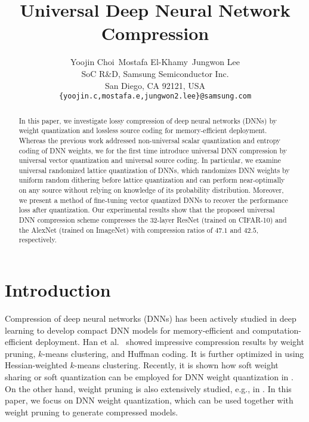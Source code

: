 \documentclass{article}
\title{Universal Deep Neural Network Compression}
\author{
  Yoojin Choi\qquad~Mostafa El-Khamy\qquad~Jungwon Lee\\
  SoC R\&D, Samsung Semiconductor Inc.\\
  San Diego, CA 92121, USA\\
  \texttt{\{yoojin.c,mostafa.e,jungwon2.lee\}@samsung.com} \\
}
\theoremstyle{remark}
\begin{document}
\maketitle

\begin{abstract}
In this paper, we investigate lossy compression of deep neural networks (DNNs) by weight quantization and lossless source coding for memory-efficient deployment. Whereas the previous work addressed non-universal scalar quantization and entropy coding of DNN weights, we for the first time introduce universal DNN compression by universal vector quantization and universal source coding. In particular, we examine universal randomized lattice quantization of DNNs, which randomizes DNN weights by uniform random dithering before lattice quantization and can perform near-optimally on any source without relying on knowledge of its probability distribution. Moreover, we present a method of fine-tuning vector quantized DNNs to recover the performance loss after quantization. Our experimental results show that the proposed universal DNN compression scheme compresses the 32-layer ResNet (trained on CIFAR-10) and the AlexNet (trained on ImageNet) with compression ratios of $47.1$ and $42.5$, respectively.%
\end{abstract}

\section{Introduction} \label{sec:intro}

Compression of deep neural networks (DNNs) has been actively studied in deep learning to develop compact DNN models for memory-efficient and computation-efficient deployment. Han et al.~\cite{han2015deep} showed impressive compression results by weight pruning, $k$-means clustering, and Huffman coding. It is further optimized in \cite{choi2016towards} using Hessian-weighted $k$-means clustering. Recently, it is shown how soft weight sharing or soft quantization can be employed for DNN weight quantization in \cite{ullrich2017soft,agustsson2017soft}. On the other hand, weight pruning is also extensively studied, e.g., in \cite{guo2016dynamic,molchanov2017variational,louizos2017bayesian,lin2017runtime,dai2018compressing}. In this paper, we focus on DNN weight quantization, which can be used together with weight pruning to generate compressed models. 
\end{document}
